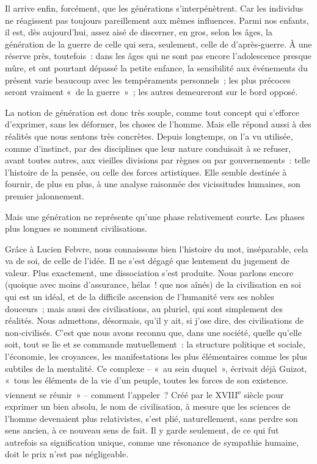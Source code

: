 \documentclass[french,twoside]{book} %
\begin{document}
Il arrive enfin, forcément, que les générations s’interpénètrent. Car les individus ne réagissent pas toujours pareillement aux mêmes influences. Parmi nos enfants, il est, dès aujourd’hui, assez aisé de discerner, en gros, selon les âges, la génération de la guerre de celle qui sera, seulement, celle de d’après‑guerre. À une réserve près, toutefois : dans les âges qui ne sont pas encore l’adolescence presque mûre, et ont pourtant dépassé la petite enfance, la sensibilité aux événements du présent varie beaucoup avec les tempéraments personnels ; les plus précoces seront vraiment « de la guerre » ; les autres demeureront sur le bord opposé.\par
La notion de génération est donc très souple, comme tout concept qui s’efforce d’exprimer, sans les déformer, les choses de l’homme. Mais elle répond aussi à des réalités que nous sentons très concrètes. Depuis long­temps, on l’a vu utilisée, comme d’instinct, par des disciplines que leur nature conduisait à se refuser, avant toutes autres, aux vieilles divisions par règnes ou par gouvernements : telle l’histoire de la pensée, ou celle des forces artistiques. Elle semble destinée à fournir, de plus en plus, à une analyse raisonnée des vicissitudes humaines, son premier jalonnement.\par
Mais une génération ne représente qu’une phase relativement courte. Les phases plus longues se nomment civilisations.\par
\label{p96} Grâce à Lucien Febvre, nous connaissons bien l’histoire du mot, insé­parable, cela va de soi, de celle de l’idée. Il ne s’est dégagé que lentement du jugement de valeur. Plus exactement, une dissociation s’est produite. Nous parlons encore (quoique avec moins d’assurance, hélas ! que nos aînés) de la civilisation en soi qui est un idéal, et de la difficile ascension de l’humanité vers ses nobles douceurs ; mais aussi des civilisations, au pluriel, qui sont simplement des réalités. Nous admettons, désormais, qu’il y ait, si j’ose dire, des civilisations de non‑civilisés. C’est que nous avons reconnu que, dans une société, quelle qu’elle soit, tout se lie et se commande mutuellement : la structure politique et sociale, l’économie, les croyances, les manifestations les plus élémentaires comme les plus subtiles de la mentalité. Ce complexe – « au sein duquel », écrivait déjà Guizot, « tous les éléments de la vie d’un peuple, toutes les forces de son existence. viennent se réunir » – comment l’appeler ? Créé par le XVIII\textsuperscript{e} siècle pour exprimer un bien absolu, le nom de civilisation, à mesure que les sciences de l’homme devenaient plus relativistes, s’est plié, naturellement, sans perdre son sens ancien, à ce nouveau sens de fait. Il y garde seulement, de ce qui fut autrefois sa signification unique, comme une résonance de sympathie humaine, doit le prix n’est pas négligeable.\par
\end{document}
